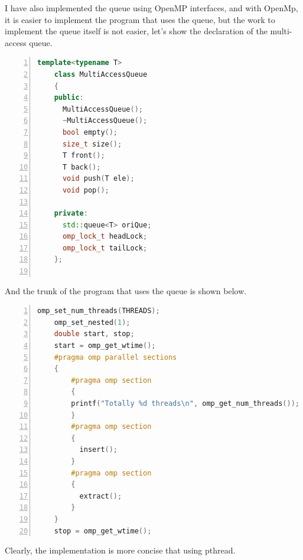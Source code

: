 \documentclass{article}
\begin{document}
	\par I have also implemented the queue using OpenMP interfaces, and with OpenMp, it is easier to implement the program that uses the queue, but the work to implement the queue itself is not easier, let's show the declaration of the multi-access queue.
	\begin{lstlisting}[language=c++, numbers=left,	numberstyle=\tiny,basicstyle=\small]
	template<typename T>
	class MultiAccessQueue
	{
	public:
	  MultiAccessQueue();
	  ~MultiAccessQueue();
	  bool empty();
	  size_t size();
	  T front();
	  T back();
	  void push(T ele);
	  void pop();

	private:
	  std::queue<T> oriQue;
	  omp_lock_t headLock;
	  omp_lock_t tailLock;
	};
	
	\end{lstlisting}
	And the trunk of the program that uses the queue is shown below.
	\begin{lstlisting}[language=c++, numbers=left,	numberstyle=\tiny,basicstyle=\small]
	omp_set_num_threads(THREADS);
	omp_set_nested(1);
	double start, stop;
	start = omp_get_wtime();
	#pragma omp parallel sections
	{
	    #pragma omp section
		{
	    printf("Totally %d threads\n", omp_get_num_threads());
		}
	    #pragma omp section
		{
		  insert();
		}
	    #pragma omp section
		{
		  extract();
		}
	}
	stop = omp_get_wtime();
	\end{lstlisting}
	Clearly, the implementation is more concise that using pthread.
\end{document}
